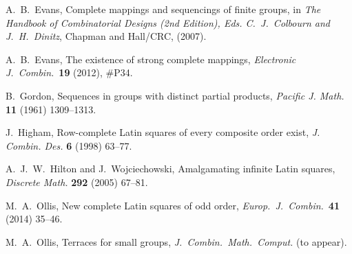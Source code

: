 \documentclass[12pt,a4paper]{article}
\begin{document}
\begin{thebibliography}{99}
A.~B.~Evans, 
Complete mappings and sequencings of finite groups, in {\em The Handbook of Combinatorial Designs (2nd Edition), Eds. C.~J.~Colbourn and J.~H.~Dinitz}, Chapman and Hall/CRC, (2007).

A.~B.~Evans, The existence of strong complete mappings, {\em Electronic J.~Combin.}~{\bf 19} (2012), \#P34.



 B.~Gordon, Sequences in groups with distinct partial products, {\em Pacific J. Math.} {\bf 11} (1961) 1309--1313.

J.~Higham, Row-complete Latin squares of every composite order exist, {\em J. Combin. Des.} {\bf 6} (1998) 63--77. 

A.~J.~W.~Hilton and J.~Wojciechowski, Amalgamating infinite Latin squares, {\em Discrete Math.} {\bf 292} (2005) 67--81.







M.~A.~Ollis, New complete Latin squares of odd order, {\em Europ.~J.~Combin.}~{\bf 41} (2014) 35--46.

M.~A.~Ollis, Terraces for small groups, {\em J.~Combin.~Math.~Comput.} (to appear).


\end{thebibliography}
\end{document}
